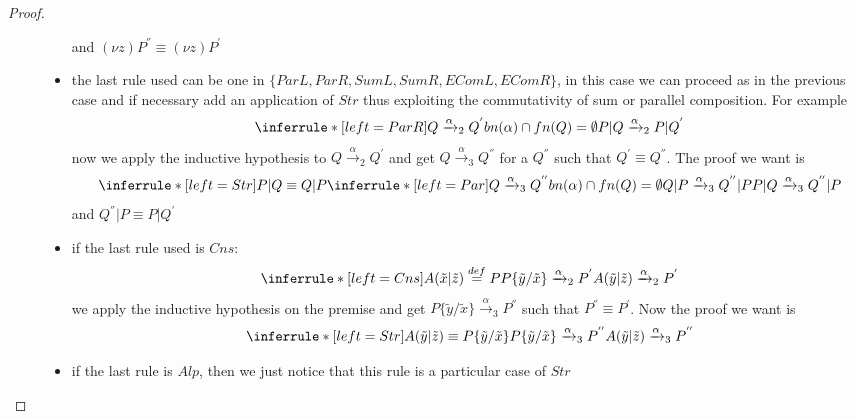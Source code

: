 \begin{theorem}
\begin{proof}
\begin{description}
\begin{itemize}
\[{		  }
		\]
		and $(\nu z) P^{''}\equiv (\nu z) P^{'}$
	      \item
		the last rule used can be one in $\{ParL, ParR, SumL, SumR, EComL, EComR\}$, in this case we can proceed as in the previous case and if necessary add an application of $Str$ thus exploiting the commutativity of sum or parallel composition. For example
		\[
		  \inferrule* [left=ParR]{
		      Q\xrightarrow{\alpha}_{2}Q^{'}
		    \\
		      bn(\alpha)\cap fn(Q)=\emptyset
		  }{
		      P|Q\xrightarrow{\alpha}_{2}P|Q^{'}
		  }
		\]	
		now we apply the inductive hypothesis to $Q\xrightarrow{\alpha}_{2}Q^{'}$ and get $Q\xrightarrow{\alpha}_{3}Q^{''}$ for a $Q^{''}$ such that $Q^{'}\equiv Q^{''}$. The proof we want is
		\[
		  \inferrule* [left=Str]{
		      P|Q\equiv Q|P
		    \\
		      \inferrule* [left=Par]{
			  Q\xrightarrow{\alpha}_{3}Q^{''}
			\\
			  bn(\alpha)\cap fn(Q)=\emptyset
		      }{
			  Q|P\xrightarrow{\alpha}_{3}Q^{''}|P
		      }
		    }{
		      P|Q\xrightarrow{\alpha}_{3}Q^{''}|P
		    }
		\]
		and $Q^{''}|P\equiv P|Q^{'}$
	      \item
		if the last rule used is $Cns$:
		\[
		    \inferrule* [left=Cns]{
			A(\tilde{x}|\tilde{z})\stackrel{def}{=}P
		      \\
			P\{\tilde{y}/\tilde{x}\}\xrightarrow{\alpha}_{2}P^{'}
		    }{
		      A(\tilde{y}|\tilde{z})\xrightarrow{\alpha}_{2}P^{'}
		    }
		\]
		we apply the inductive hypothesis on the premise and get $P\{\tilde{y}/\tilde{x}\}\xrightarrow{\alpha}_{3}P^{''}$ such that $P^{''}\equiv P^{'}$. Now the proof we want is
		\[
		    \inferrule* [left=Str]{
			A(\tilde{y}|\tilde{z})\equiv P\{\tilde{y}/\tilde{x}\}
		      \\
			P\{\tilde{y}/\tilde{x}\}\xrightarrow{\alpha}_{3}P^{''}
		    }{
		      A(\tilde{y}|\tilde{z})\xrightarrow{\alpha}_{3}P^{''}
		    }
		\]		
	      \item
		if the last rule is $Alp$, then we just notice that this rule is a particular case of $Str$

\end{itemize}
\end{description}
\end{proof}
\end{theorem}
